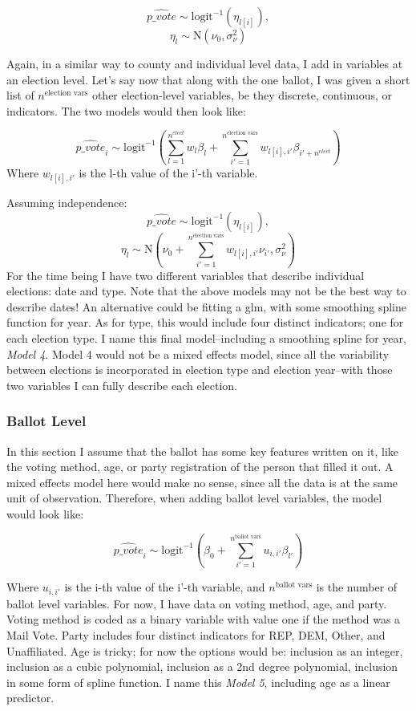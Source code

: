 \documentclass[12pt,twoside]{reedthesis}
\begin{document}
  \[\hat{p\_vote} \sim \text{logit}^{-1}(\eta_{l[i]}), \]
  \[\eta_{l} \sim \text{N}(\nu_0, \sigma_{\nu}^2)\]
  
  Again, in a similar way to county and individual level data, I add in
  variables at an election level. Let's say now that along with the one
  ballot, I was given a short list of \(n^{\text{election vars}}\) other
  election-level variables, be they discrete, continuous, or indicators.
  The two models would then look like:
  
  \[\hat{p\_vote}_i \sim \text{logit}^{-1}(\sum_{l = 1}^{n^{elect}}w_{l}\beta_{l} + \sum_{i'=1}^{n^{\text{election vars}}}w_{l[i], i'}\beta_{i'+n^{elect}})\]
  Where \(w_{l[i], i'}\) is the l-th value of the i'-th variable.
  
  Assuming independence:
  \[\hat{p\_vote} \sim \text{logit}^{-1}(\eta_{l[i]}), \]
  \[\eta_{l} \sim \text{N}(\nu_0 + \sum_{i'=1}^{n^{\text{election vars}}}w_{l[i], i'}\nu_{i'}, \sigma_{\nu}^2)\]
  For the time being I have two different variables that describe
  individual elections: date and type. Note that the above models may not
  be the best way to describe dates! An alternative could be fitting a
  glm, with some smoothing spline function for year. As for type, this
  would include four distinct indicators; one for each election type. I
  name this final model--including a smoothing spline for year,
  \emph{Model 4}. Model 4 would not be a mixed effects model, since all
  the variability between elections is incorporated in election type and
  election year--with those two variables I can fully describe each
  election.
  
  \subsubsection{Ballot Level}\label{ballot-level}
  
  In this section I assume that the ballot has some key features written
  on it, like the voting method, age, or party registration of the person
  that filled it out. A mixed effects model here would make no sense,
  since all the data is at the same unit of observation. Therefore, when
  adding ballot level variables, the model would look like:
  
  \[\hat{p\_vote}_i \sim \text{logit}^{-1}(\beta_0 + \sum_{i' = 1}^{n^{\text{ballot vars}}}u_{i,i'}\beta_{l'})\]
  
  Where \(u_{i,i'}\) is the i-th value of the i'-th variable, and
  \(n^{\text{ballot vars}}\) is the number of ballot level variables. For
  now, I have data on voting method, age, and party. Voting method is
  coded as a binary variable with value one if the method was a Mail Vote.
  Party includes four distinct indicators for REP, DEM, Other, and
  Unaffiliated. Age is tricky; for now the options would be: inclusion as
  an integer, inclusion as a cubic polynomial, inclusion as a 2nd degree
  polynomial, inclusion in some form of spline function. I name this
  \emph{Model 5}, including age as a linear predictor.
  
\end{document}
